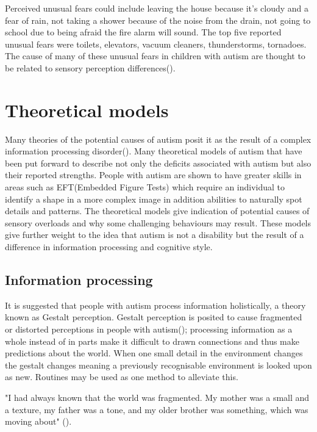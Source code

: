 \documentclass[11pt]{report}
\begin{document}
Perceived unusual fears could include leaving the house because it's cloudy and a fear of rain, not taking a shower because of the noise from the drain, not going to school due to being afraid the fire alarm will sound. The top five reported unusual fears were toilets, elevators, vacuum cleaners, thunderstorms, tornadoes. The cause of many of these unusual fears in children with autism are thought to be related to sensory perception differences(\cite{fears}).

\section{Theoretical models}
Many theories of the potential causes of autism posit it as the result of a complex information processing disorder(\cite{minshewmodel}). Many theoretical models of autism that have been put forward to describe not only the deficits associated with autism but also their reported strengths. People with autism are shown to have greater skills in areas such as EFT(Embedded Figure Tests) which require an individual to identify a shape in a more complex image in addition abilities to naturally spot details and patterns. The theoretical models give indication of potential causes of sensory overloads and why some challenging behaviours may result. These models give further weight to the idea that autism is not a disability but the result of a difference in information processing and cognitive style. 

\subsection{Information processing}

It is suggested that people with autism process information holistically, a theory known as Gestalt perception. Gestalt perception is posited to cause fragmented or distorted perceptions in people with autism(\cite{olgab}); processing information as a whole instead of in parts make it difficult to drawn connections and thus make predictions about the world. When one small detail in the environment changes the gestalt changes meaning a previously recognisable environment is looked upon as new. Routines may be used as one method to alleviate this.

"I had always known that the world was fragmented. My mother was a small and a texture, my father was a tone, and my older brother was something, which was moving about" (\cite{williams1992}). 
\end{document}
